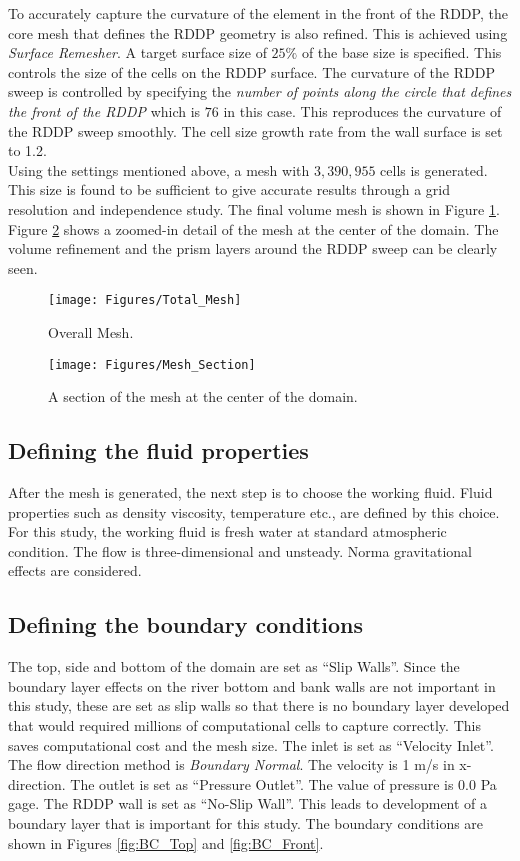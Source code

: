 \noindent To accurately capture the curvature of the element in the front of the RDDP, the core mesh that defines the RDDP geometry is also refined. This is achieved using \textit{Surface Remesher}. A target surface size of $25\%$ of the base size is specified. This controls the size of the cells on the RDDP surface. The curvature of the RDDP sweep is controlled by specifying the \textit{number of points along the circle that defines the front of the RDDP} which is $76$ in this case. This reproduces the curvature of the RDDP sweep smoothly. The cell size growth rate from the wall surface is set to 1.2.\\
Using the settings mentioned above, a mesh with $3,390,955$ cells is generated. This size is found to be sufficient to give accurate results through a grid resolution and independence study. The final volume mesh is shown in Figure \ref{fig:Total_Mesh}. Figure \ref{fig:Mesh_Section} shows a zoomed-in detail of the mesh at the center of the domain. The volume refinement and the prism layers around the RDDP sweep can be clearly seen.\\

\begin{figure}
\centering
\texttt{[image: Figures/Total\_Mesh]}
\caption{\label{fig:Total_Mesh}Overall Mesh.}
\end{figure}

\begin{figure}
\centering
\texttt{[image: Figures/Mesh\_Section]}
\caption{\label{fig:Mesh_Section}A section of the mesh at the center of the domain.}
\end{figure}

\subsection*{Defining the fluid properties}
After the mesh is generated, the next step is to choose the working fluid. Fluid properties such as density viscosity, temperature etc., are defined by this choice. For this study, the working fluid is fresh water at standard atmospheric condition. The flow is three-dimensional and unsteady. Norma gravitational effects are considered.

\subsection*{Defining the boundary conditions}
The top, side and bottom of the domain are set as ``Slip Walls''. Since the boundary layer effects on the river bottom and bank walls are not important in this study, these are set as slip walls so that there is no boundary layer developed that would required millions of computational cells to capture correctly. This saves computational cost and the mesh size. The inlet is set as ``Velocity Inlet''. The flow direction method is \textit{Boundary Normal}. The velocity is 1 m/s in x-direction. The outlet is set as ``Pressure Outlet''. The value of pressure is 0.0 Pa gage. The RDDP wall is set as ``No-Slip Wall''. This leads to development of a boundary layer that is important for this study. The boundary conditions are shown in Figures \ref{fig:BC_Top} and \ref{fig:BC_Front}.\\

